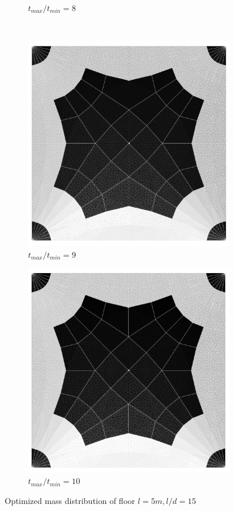 \begin{figure}[H]
\begin{subfigure}[b]{.32\textwidth}
  \caption{$t_{max}/t_{min}=8$}
\end{subfigure}
~
\begin{subfigure}[b]{.32\textwidth}
  \centering
  \includegraphics[width=.99\linewidth]{images/t_opt_l2d15_gamma9}
  \caption{$t_{max}/t_{min}=9$}
\end{subfigure}

\begin{subfigure}[b]{.32\textwidth}
  \centering
  \includegraphics[width=.99\linewidth]{images/t_opt_l2d15_gamma10}
  \caption{$t_{max}/t_{min}=10$}
\end{subfigure}

\caption{Optimized mass distribution of floor $l=5m,l/d=15$}
\label{fig:opt_floor_l2d15}
\end{figure}


